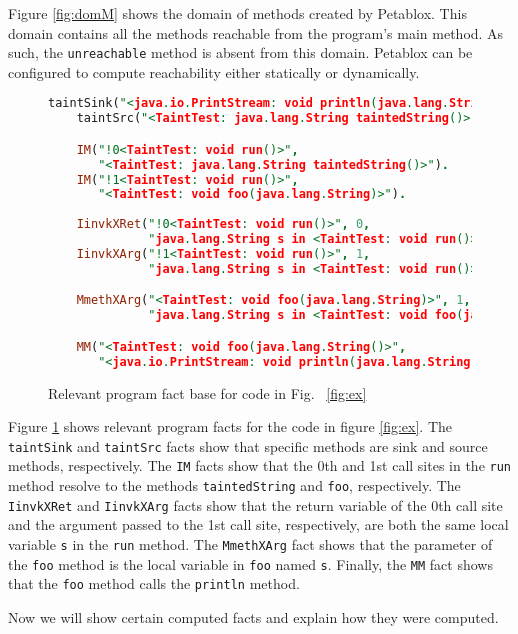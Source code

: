 Figure \ref{fig:domM} shows the domain of methods created by
Petablox. This domain contains all the methods reachable from the
program's main method. As such, the \texttt{unreachable} method is
absent from this domain. Petablox can be configured to compute
reachability either statically or dynamically.

\begin{figure}[H]
  \begin{lstlisting}[language=Prolog]
    taintSink("<java.io.PrintStream: void println(java.lang.String)>").
    taintSrc("<TaintTest: java.lang.String taintedString()>").

    IM("!0<TaintTest: void run()>",
       "<TaintTest: java.lang.String taintedString()>").
    IM("!1<TaintTest: void run()>",
       "<TaintTest: void foo(java.lang.String)>").
    
    IinvkXRet("!0<TaintTest: void run()>", 0,
              "java.lang.String s in <TaintTest: void run()>").
    IinvkXArg("!1<TaintTest: void run()>", 1,
              "java.lang.String s in <TaintTest: void run()>").

    MmethXArg("<TaintTest: void foo(java.lang.String)>", 1,
              "java.lang.String s in <TaintTest: void foo(java.lang.String)>").

    MM("<TaintTest: void foo(java.lang.String()>",
       "<java.io.PrintStream: void println(java.lang.String)>").
  \end{lstlisting}
  \caption{Relevant program fact base for code in Fig.~ \ref{fig:ex}}\label{fig:facts}
\end{figure}

Figure \ref{fig:facts} shows relevant program facts for the code in
figure \ref{fig:ex}. The \texttt{taintSink} and \texttt{taintSrc}
facts show that specific methods are sink and source methods,
respectively. The \texttt{IM} facts show that the 0th and 1st call
sites in the \texttt{run} method resolve to the methods
\texttt{taintedString} and \texttt{foo}, respectively. The
\texttt{IinvkXRet} and \texttt{IinvkXArg} facts show that the return
variable of the 0th call site and the argument passed to the 1st call
site, respectively, are both the same local variable \texttt{s} in the
\texttt{run} method. The \texttt{MmethXArg} fact shows that the
parameter of the \texttt{foo} method is the local variable in
\texttt{foo} named \texttt{s}. Finally, the \texttt{MM} fact shows
that the \texttt{foo} method calls the \texttt{println} method.

Now we will show certain computed facts and explain how they were
computed.

